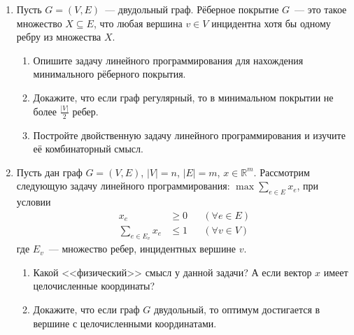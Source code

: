\documentclass[11pt]{article}
\newenvironment{exercise}{\item}{}
\begin{document}
\begin{enumerate}
\begin{exercise}
Пусть $G = (V, E)$~--- двудольный граф.
Рёберное покрытие $G$~--- это такое множество $X \subseteq E$,
что любая вершина $v \in V$ инцидентна хотя бы одному ребру из множества $X$.
\begin{enumerate}
\item
	Опишите задачу линейного программирования для нахождения минимального рёберного покрытия.
\item
	Докажите, что если граф регулярный, то в минимальном покрытии не более $\frac{|V|}{2}$ ребер.
\item
	Постройте двойственную задачу линейного программирования и изучите её комбинаторный смысл.
\end{enumerate}
\end{exercise}


\begin{exercise}
Пусть дан граф $G = (V, E)$, $|V| = n$, $|E| = m$, $x \in \mathbb{R}^m$. Рассмотрим следующую
задачу линейного программирования:
$\max \sum\limits_{e \in E} x_e$, при условии
\begin{align*}
	x_e &\geqslant 0
		&& (\forall e \in E) \\
	\sum_{e \in E_v} x_e &\leqslant 1
		&& (\forall v \in V)
\end{align*}
где $E_v$~--- множество ребер, инцидентных вершине $v$.
\begin{enumerate}
\item
	Какой <<физический>> смысл у данной задачи? А если вектор $x$ имеет целочисленные координаты?
\item
	Докажите, что если граф $G$ двудольный, то оптимум достигается в вершине с целочисленными
	координатами.
\end{enumerate}
\end{exercise}

\end{enumerate}
\end{document}
